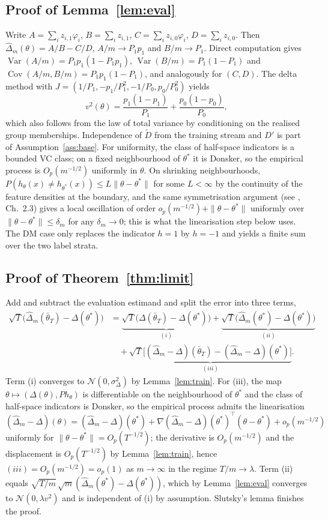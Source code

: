 \documentclass[pdflatex,sn-basic]{sn-jnl}
\newcommand{\dhat}{\hat\Delta}
\newcommand{\tbar}{\bar\theta}
\newcommand{\Dp}{D'}
\newcommand{\Dt}{\tilde D}
\begin{document}
\subsection{Proof of Lemma~\ref{lem:eval}}
Write $A=\sum_{i}z_{i,1}\varphi_i$, $B=\sum_i z_{i,1}$, $C=\sum_i z_{i,0}\varphi_i$, $D=\sum_i z_{i,0}$.
Then $\dhat_m(\theta)=A/B-C/D$, $A/m\to P_1p_1$ and $B/m\to P_1$.  Direct computation gives
$\operatorname{Var}(A/m)=P_1p_1(1-P_1p_1)$, $\operatorname{Var}(B/m)=P_1(1-P_1)$ and
$\operatorname{Cov}(A/m,B/m)=P_1p_1(1-P_1)$, and analogously for $(C,D)$.  The delta method with
$J=(1/P_1,-p_1/P_1^2,-1/P_0,p_0/P_0^2)$ yields
\[
v^2(\theta)=\frac{p_1(1-p_1)}{P_1}+\frac{p_0(1-p_0)}{P_0},
\]
which also follows from the law of total variance by conditioning on the realised group memberships.
Independence of $\Dt$ from the training stream and $\Dp$ is part of Assumption~\ref{ass:base}.
For uniformity, the class of half-space indicators is a bounded VC class; on a fixed neighbourhood
of $\theta^*$ it is Donsker, so the empirical process is $O_p(m^{-1/2})$ uniformly in $\theta$.  On
shrinking neighbourhoods, $P(h_\theta(x)\neq h_{\theta^*}(x))\le L\|\theta-\theta^*\|$ for some
$L<\infty$ by the continuity of the feature densities at the boundary, and the same symmetrisation
argument (see \citealp{vdvwellner1996}, Ch.~2.3) gives a local oscillation of order
$o_p(m^{-1/2})+\|\theta-\theta^*\|$ uniformly over $\|\theta-\theta^*\|\le\delta_m$ for any
$\delta_m\to0$; this is what the linearisation step below uses.  The DM case only replaces the
indicator $h=1$ by $h=-1$ and yields a finite sum over the two label strata.

\subsection{Proof of Theorem~\ref{thm:limit}}
Add and subtract the evaluation estimand and split the error into three terms,
\begin{align*}
\sqrt T\big(\dhat_m(\tbar_T)-\Delta(\theta^*)\big)
&=\underbrace{\sqrt T\big(\Delta(\tbar_T)-\Delta(\theta^*)\big)}_{(i)}
+\underbrace{\sqrt T\big(\dhat_m(\theta^*)-\Delta(\theta^*)\big)}_{(ii)}\\
&\quad+\underbrace{\sqrt T\big[(\dhat_m-\Delta)(\tbar_T)-(\dhat_m-\Delta)(\theta^*)\big]}_{(iii)}.
\end{align*}
Term (i) converges to $\mathcal N(0,\sigma^2_\Delta)$ by Lemma~\ref{lem:train}.  For (iii), the map $\theta\mapsto(\Delta(\theta),P h_\theta)$ is differentiable on the neighbourhood of $\theta^*$ and the class of half-space indicators is Donsker, so the empirical process admits the linearisation $(\dhat_m-\Delta)(\theta)=(\dhat_m-\Delta)(\theta^*)+\nabla(\dhat_m-\Delta)(\theta^*)^\top(\theta-\theta^*)+o_p(m^{-1/2})$ uniformly for $\|\theta-\theta^*\|=O_p(T^{-1/2})$; the derivative is $O_p(m^{-1/2})$ and the displacement is $O_p(T^{-1/2})$ by Lemma~\ref{lem:train}, hence $(iii)=O_p(m^{-1/2})=o_p(1)$ as $m\to\infty$ in the regime $T/m\to\lambda$.  Term (ii) equals
$\sqrt{T/m}\,\sqrt m(\dhat_m(\theta^*)-\Delta(\theta^*))$, which by Lemma~\ref{lem:eval} converges to
$\mathcal N(0,\lambda v^2)$ and is independent of (i) by assumption.  Slutsky's lemma finishes the
proof.
\end{document}
